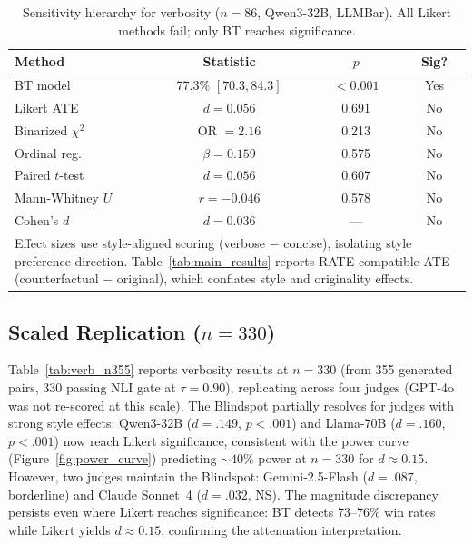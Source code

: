 \begin{table}[h]
\centering
\small
\caption{Sensitivity hierarchy for verbosity ($n = 86$, Qwen3-32B, LLMBar). All Likert methods fail; only BT reaches significance.}
\label{tab:verb_sensitivity}
\begin{tabular}{lccc}
\toprule
Method & Statistic & $p$ & Sig? \\
\midrule
BT model & 77.3\% $[70.3, 84.3]$ & ${<}0.001$ & Yes \\
\midrule
Likert ATE & $d = 0.056$ & 0.691 & No \\
Binarized $\chi^2$ & OR $= 2.16$ & 0.213 & No \\
Ordinal reg.\ & $\beta = 0.159$ & 0.575 & No \\
Paired $t$-test & $d = 0.056$ & 0.607 & No \\
Mann-Whitney $U$ & $r = {-}0.046$ & 0.578 & No \\
Cohen's $d$ & $d = 0.036$ & --- & No \\
\bottomrule
\multicolumn{4}{p{0.9\columnwidth}}{\footnotesize Effect sizes use style-aligned scoring (verbose $-$ concise), isolating style preference direction. Table~\ref{tab:main_results} reports RATE-compatible ATE (counterfactual $-$ original), which conflates style and originality effects.}
\end{tabular}
\end{table}

\subsection{Scaled Replication ($n = 330$)}
\label{app:verb_n355}

Table~\ref{tab:verb_n355} reports verbosity results at $n = 330$ (from 355 generated pairs, 330 passing NLI gate at $\tau = 0.90$), replicating across four judges (GPT-4o was not re-scored at this scale).
The Blindspot partially resolves for judges with strong style effects: Qwen3-32B ($d = .149$, $p < .001$) and Llama-70B ($d = .160$, $p < .001$) now reach Likert significance, consistent with the power curve (Figure~\ref{fig:power_curve}) predicting ${\sim}40\%$ power at $n = 330$ for $d \approx 0.15$.
However, two judges maintain the Blindspot: Gemini-2.5-Flash ($d = .087$, borderline) and Claude Sonnet~4 ($d = .032$, NS).
The magnitude discrepancy persists even where Likert reaches significance: BT detects 73--76\% win rates while Likert yields $d \approx 0.15$, confirming the attenuation interpretation.

